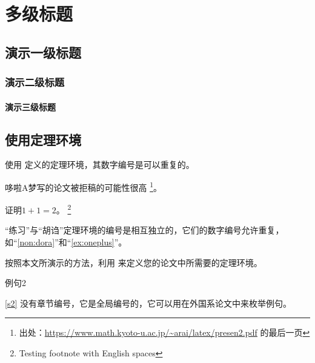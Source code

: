 
\chapter{多级标题}

\section{演示一级标题}
\subsection{演示二级标题}
\subsubsection{演示三级标题}

\section{使用定理环境}

使用  定义的定理环境，其数字编号是可以重复的。

\begin{nonsense}
\label{non:dora}
哆啦A梦写的论文被拒稿的可能性很高
\footnote{出处：\url{https://www.math.kyoto-u.ac.jp/~arai/latex/presen2.pdf} 的最后一页}。
\end{nonsense}

\begin{exercise}
\label{ex:oneplus}
证明$1+1 = 2$。
\footnote{Testing footnote with English spaces}
\end{exercise}

\begin{nonsense}[右边的胡诌是真的]
“练习”与“胡诌”定理环境的编号是相互独立的，它们的数字编号允许重复，
如“\autoref{non:dora}”和“\autoref{ex:oneplus}”。
\end{nonsense}

\begin{exercise}
按照本文所演示的方法，利用  来定义您的论文中所需要的定理环境。
\end{exercise}

\begin{lines}
\label{s2}
例句2
\end{lines}

\autoref{s2} 没有章节编号，它是全局编号的，它可以用在外国系论文中来枚举例句。

